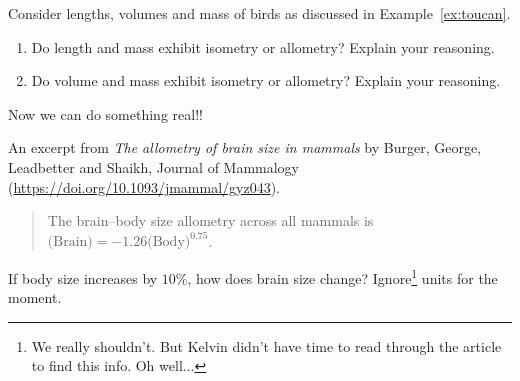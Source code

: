\documentclass[../main.tex]{subfiles}
\begin{document}
\begin{example} \label{ex:allometry-birds}
  Consider lengths, volumes and mass of birds as discussed in Example~\ref{ex:toucan}.

  \begin{enumerate}[wide]
    \item Do length and mass exhibit isometry or allometry? Explain your reasoning.


    \item Do volume and mass exhibit isometry or allometry? Explain your reasoning.

  \end{enumerate}
\end{example}

Now we can do something real!! {} 
\begin{example} \label{ex:allometry-brain-body}
  An excerpt from \emph{The allometry of brain size in mammals} by Burger, George, Leadbetter and Shaikh, Journal of Mammalogy (\url{https://doi.org/10.1093/jmammal/gyz043}).
  \begin{quote}
    The brain–body size allometry across all mammals is \(\text{(Brain)} = −1.26 \text{(Body)}^{0.75}\).
  \end{quote}

  If body size increases by \(10\%\), how does brain size change? Ignore\footnote{We really shouldn't. But Kelvin didn't have time to read through the article to find this info. Oh well...} units for the moment. 

  \blanks*
\end{example}
\end{document}
